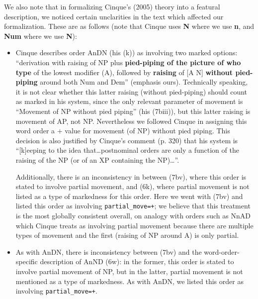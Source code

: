 \documentclass[11pt]{article}
\begin{document}
We also note that in formalizing Cinque's (2005) theory into a
featural description, we noticed certain unclarities in the text which
affected our formalization.  These are as follows (note that Cinque
uses \textbf{N} where we use \textbf{n}, and \textbf{Num} where we use
\textbf{N}):
%
\begin{itemize}
\item Cinque describes order AnDN (his (k)) as involving two marked
  options: ``derivation with raising of NP plus \textbf{pied-piping of
    the picture of who type} of the lowest modifier (A), followed by
  \textbf{raising} of [A N] \textbf{without pied-piping} around both
  Num and Dem'' (emphasis ours).  Technically speaking, it is not
  clear whether this latter raising (without pied-piping) should count
  as marked in his system, since the only relevant parameter of
  movement is ``Movement of NP without pied piping'' (his (7biii)),
  but this latter raising is movement of AP, not NP.  Nevertheless we
  followed Cinque in assigning this word order a $+$ value for
  movement (of NP) without pied piping.  This decision is also
  justified by Cinque's comment (p. 320) that his system is ``[k]eeping to the
  idea that\ldots postnominal orders are only a function of the
  raising of the NP (or of an XP containing the NP)\ldots''.

Additionally, there is an
   inconsistency in \citet{cinque2005deriving} between (7bv), where
   this order is stated to involve partial movement, and (6k), where
   partial movement is not listed as a type of markedness for this
   order. Here we went with (7bv) and listed this order as involving
   \verb-partial_move=+-; we believe that this treatment is the most
   globally consistent overall, on analogy with orders such as NnAD
   which Cinque treats as involving partial movement because there are
   multiple types of movement and the first (raising of NP around A)
   is only partial.
 \item As with AnDN, there is inconsistency between (7bv) and the
   word-order-specific description of AnND (6w): in the  former, this order is
   stated to involve partial movement of NP, but in the latter,
   partial movement is not mentioned as a type of markedness.  As with AnDN,
   we listed this order as involving \verb-partial_move=+-.   %
\end{itemize}
\end{document}
